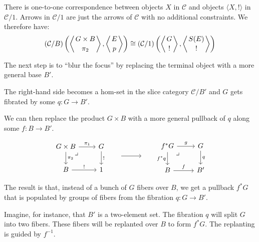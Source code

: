 \documentclass[DaoFP]{subfiles}
\begin{document}
There is one-to-one correspondence between objects $X$ in $\mathcal{C}$ and objects $\langle X, ! \rangle$ in  $\mathcal{C}/1$. Arrows in $\mathcal{C}/1$ are just the arrows of $\mathcal{C}$ with no additional constraints. We therefore have:
\[(\mathcal{C}/B) \left( \left \langle {G\times B \atop \pi_2} \right \rangle , \left \langle {E \atop p } \right \rangle \right) \cong (\mathcal{C}/1)  \left( \left \langle {G \atop !} \right \rangle , \left \langle {S(E) \atop ! } \right \rangle \right)  \]

The next step is to ``blur the focus'' by replacing the terminal object with a more general base $B'$. 

The right-hand side becomes a hom-set in the slice category $\mathcal{C}/B'$ and $G$ gets fibrated by some $q \colon G \to B'$. 

We can then replace the product $G \times B$ with a more general pullback of $q$ along some $f \colon B \to B'$.

\[
 \begin{tikzcd}
 G \times B
 \arrow[dr, phantom,  , very near start, "\lrcorner"]
\arrow[d, "\pi_2"]
 \arrow[r, "\pi_1"]
 & G
 \arrow[d, "!"]
 \\
 B
 \arrow[r, "!"]
 &
 1
 \end{tikzcd}
 \hspace{20pt}
\begin{tikzpicture}
\draw[->] (0, 0) -- (1, 0);
\end{tikzpicture}
 \hspace{20pt}
 \begin{tikzcd}
 f^* G
\arrow[dr, phantom,  , very near start, "\lrcorner"]
 \arrow[d, "f^*q"']
 \arrow[r, "g"]
 & G
 \arrow[d, "q"]
 \\
 B
 \arrow[r, "f"]
 &B'
\end{tikzcd}
\]

The result is that, instead of a bunch of $G$ fibers over $B$, we get a pullback $f^* G$ that is populated by groups of fibers from the fibration $q \colon G \to B'$. 

Imagine, for instance, that $B'$ is a two-element set. The fibration $q$ will split $G$ into two fibers. These fibers will be replanted over $B$ to form $f^* G$. The replanting is guided by $f^{-1}$. 
\end{document}
